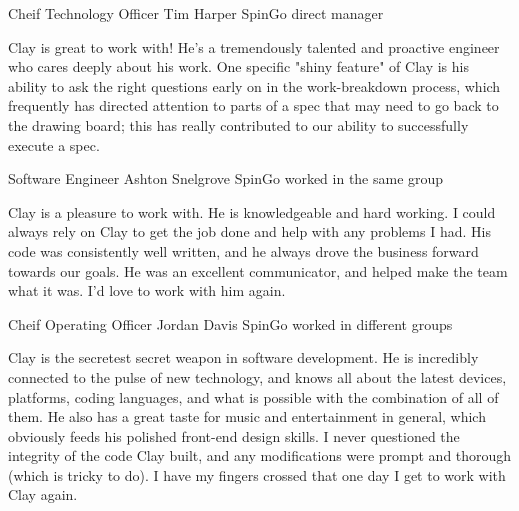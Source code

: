 
\begin{cventries}

  \cventry
    {Cheif Technology Officer} %
    {Tim Harper} %
    {SpinGo} %
    {direct manager} %
    {
      \begin{cvparagraph}
      Clay is great to work with! He's a tremendously talented and proactive engineer who cares deeply about his work. One specific "shiny feature" of Clay is his ability to ask the right questions early on in the work-breakdown process, which frequently has directed attention to parts of a spec that may need to go back to the drawing board; this has really contributed to our ability to successfully execute a spec.
      \end{cvparagraph}
    }

  \cventry
    {Software Engineer} %
    {Ashton Snelgrove} %
    {SpinGo} %
    {worked in the same group} %
    {
      \begin{cvparagraph}
      Clay is a pleasure to work with. He is knowledgeable and hard working. I could always rely on Clay to get the job done and help with any problems I had. His code was consistently well written, and he always drove the business forward towards our goals. He was an excellent communicator, and helped make the team what it was. I'd love to work with him again.
      \end{cvparagraph}
    }

  \cventry
    {Cheif Operating Officer} %
    {Jordan Davis} %
    {SpinGo} %
    {worked in different groups} %
    {
      \begin{cvparagraph}
      Clay is the secretest secret weapon in software development. He is incredibly connected to the pulse of new technology, and knows all about the latest devices, platforms, coding languages, and what is possible with the combination of all of them. He also has a great taste for music and entertainment in general, which obviously feeds his polished front-end design skills. I never questioned the integrity of the code Clay built, and any modifications were prompt and thorough (which is tricky to do). I have my fingers crossed that one day I get to work with Clay again.
      \end{cvparagraph}
    }

\end{cventries}
